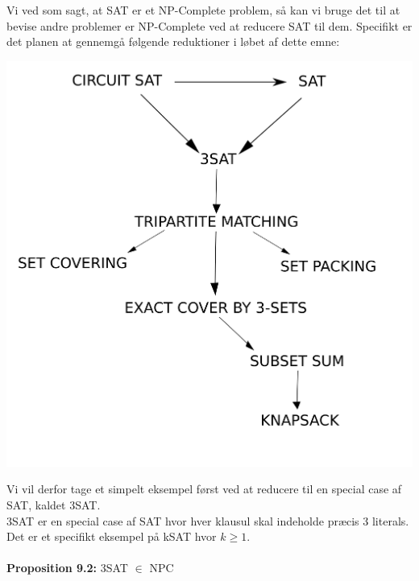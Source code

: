Vi ved som sagt, at SAT er et NP-Complete problem, så kan vi bruge det til at bevise andre problemer er NP-Complete ved at reducere SAT til dem.
Specifikt er det planen at gennemgå følgende reduktioner i løbet af dette emne:
\begin{center}
 \includegraphics[bb=0 0 400 400,scale=0.5]{./GraphReductionTreeSetNumbers.png}
\end{center}

Vi vil derfor tage et simpelt eksempel først ved at reducere til en special case af SAT, kaldet 3SAT.\\
3SAT er en special case af SAT hvor hver klausul skal indeholde præcis 3 literals. Det er et specifikt eksempel på kSAT hvor $k \geq 1$.\\
~\\
\textbf{Proposition 9.2:} 3SAT $\in$ NPC

